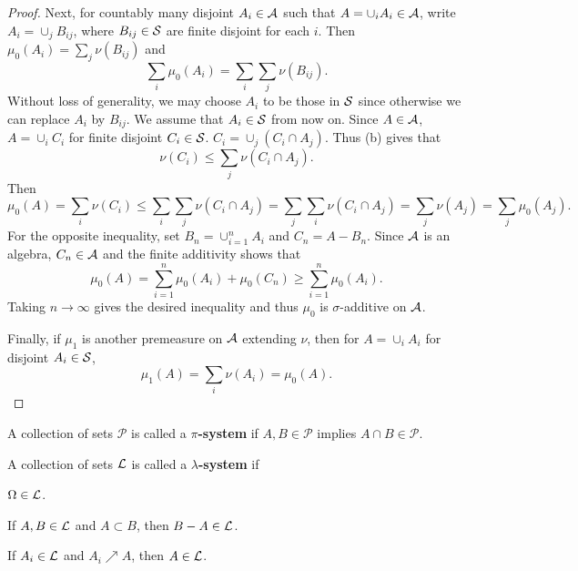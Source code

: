 \begin{proof}
    Next, for countably many disjoint $A_i\in\A$ such that 
    $A = \cup_i A_i\in\A$, write $A_i = \cup_j B_{ij}$, where 
    $B_{ij}\in\S$ are finite disjoint for each $i$. Then 
    $\mu_0(A_i) = \sum_j \nu(B_{ij})$ and
    \begin{equation*}
        \sum_i \mu_0(A_i) = \sum_i\sum_j \nu(B_{ij}).
    \end{equation*}
    Without loss of generality, we may choose $A_i$ to be those in $\S$
    since otherwise we can replace $A_i$ by $B_{ij}$. We assume that $A_i\in\S$ 
    from now on. Since $A\in\A$, $A = \cup_i C_i$ for finite disjoint 
    $C_i\in\S$. $C_i = \cup_j (C_i\cap A_j)$. Thus (b) gives that 
    \begin{equation*}
        \nu(C_i) \leq \sum_j \nu(C_i\cap A_j).
    \end{equation*}
    Then 
    \begin{equation*}
        \mu_0(A) = \sum_i \nu(C_i) \leq \sum_i\sum_j \nu(C_i\cap A_j) 
        = \sum_j\sum_i \nu(C_i\cap A_j) = \sum_j \nu(A_j) = \sum_j \mu_0(A_j).
    \end{equation*}
    For the opposite inequality, set $B_n = \cup_{i=1}^n A_i$ and $C_n = A - B_n$. 
    Since $\A$ is an algebra, $C_n\in\A$ and the finite additivity shows that 
    \begin{equation*}
        \mu_0(A) = \sum_{i=1}^n\mu_0(A_i) + \mu_0(C_n) \geq \sum_{i=1}^n \mu_0(A_i).
    \end{equation*}
    Taking $n\to\infty$ gives the desired inequality and thus $\mu_0$ is $\sigma$-additive 
    on $\A$. 

    Finally, if $\mu_1$ is another premeasure on $\A$ extending $\nu$, then for
    $A = \cup_i A_i$ for disjoint $A_i\in\S$,
    \begin{equation*}
        \mu_1(A) = \sum_i \nu(A_i) = \mu_0(A).
    \end{equation*}
\end{proof}

\begin{definition}
    A collection of sets $\mathcal{P}$ is called a \textbf{$\pi$-system} if
    $A, B\in\mathcal{P}$ implies $A\cap B\in\mathcal{P}$.
\end{definition}

\begin{definition}
    A collection of sets $\L$ is called a \textbf{$\lambda$-system} if 
    \begin{thmenum}
        \item $\Omega\in\L$. 
        \item If $A, B\in\L$ and $A\subset B$, then $B - A\in\L$. 
        \item If $A_i\in\L$ and $A_i\nearrow A$, then $A\in\L$.
    \end{thmenum}
\end{definition}

